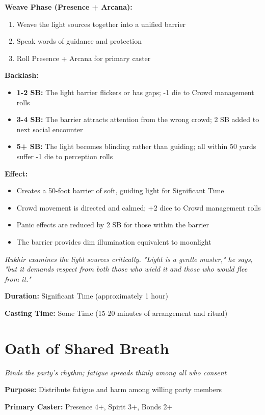 \documentclass[12pt,twoside]{book}
\newcommand{\shadow}[1]{\textit{#1}}
\begin{document}
\textbf{Weave Phase (Presence + Arcana):}
\begin{enumerate}
\item Weave the light sources together into a unified barrier
\item Speak words of guidance and protection
\item Roll Presence + Arcana for primary caster
\end{enumerate}

\textbf{Backlash:}
\begin{itemize}
\item \textbf{1-2 SB:} The light barrier flickers or has gaps; -1 die to Crowd management rolls
\item \textbf{3-4 SB:} The barrier attracts attention from the wrong crowd; 2 SB added to next social encounter
\item \textbf{5+ SB:} The light becomes blinding rather than guiding; all within 50 yards suffer -1 die to perception rolls
\end{itemize}

\textbf{Effect:}
\begin{itemize}
\item Creates a 50-foot barrier of soft, guiding light for Significant Time
\item Crowd movement is directed and calmed; +2 dice to Crowd management rolls
\item Panic effects are reduced by 2 SB for those within the barrier
\item The barrier provides dim illumination equivalent to moonlight
\end{itemize}

\shadow{Rukhir examines the light sources critically. "Light is a gentle master," he says, "but it demands respect from both those who wield it and those who would flee from it."}

\textbf{Duration:} Significant Time (approximately 1 hour)

\textbf{Casting Time:} Some Time (15-20 minutes of arrangement and ritual)

\section*{Oath of Shared Breath}
\textit{Binds the party's rhythm; fatigue spreads thinly among all who consent}

\textbf{Purpose:} Distribute fatigue and harm among willing party members

\textbf{Primary Caster:} Presence 4+, Spirit 3+, Bonds 2+
\end{document}
